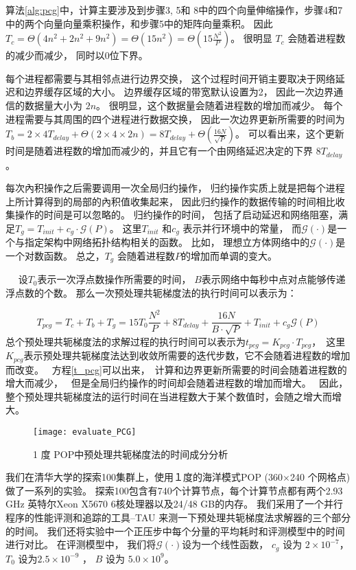 算法\ref{alg:pcg}中，计算主要涉及到步骤3, 5和 8中的四个向量伸缩操作，步骤4和7中的两个向量向量乘积操作，和步骤5中的矩阵向量乘积。 
 因此 $T_c= \Theta (4 n^2 +2n^2+ 9n^2) = \Theta (15n^2) =\Theta(15\frac{N^2}{P})$。 
很明显 $T_c$ 会随着进程数的减少而减少， 同时以0位下界。 


每个进程都需要与其相邻点进行边界交换， 这个过程时间开销主要取决于网络延迟和边界缓存区域的大小。 
边界缓存区域的带宽默认设置为2， 因此一次边界通信的数据量大小为 $2n$。 
很明显，这个数据量会随着进程数的增加而减少。 
每个进程需要与其周围的四个进程进行数据交换， 因此一次边界更新所需要的时间为$T_b =2\times4T_{delay} +\Theta (2\times4\times 2n)=8T_{delay} +\Theta (\frac{16N}{\sqrt{P}})$。 
可以看出来，这个更新时间是随着进程数的增加而减少的，并且它有一个由网络延迟决定的下界 $8T_{delay}$。 

 
每次內积操作之后需要调用一次全局归约操作， 归约操作实质上就是把每个进程上所计算得到的局部的內积值收集起来，
因此归约操作的数据传输的时间相比收集操作的时间是可以忽略的。 
归约操作的时间， 包括了启动延迟和网络阻塞，满足$T_g= T_{init}+ c_g\cdot \mathcal{G}(P)$。 
这里$T_{init}$ 和$c_g$ 表示并行环境中的常量， 而$\mathcal{G}(\cdot)$是一个与指定架构中网络拓扑结构相关的函数。 
比如， 理想立方体网络中的$\mathcal{G}(\cdot)$是一个对数函数。 
总之，$T_g$ 会随着进程数$P$的增加而单调的变大。 
 

　
设$T_0$表示一次浮点数操作所需要的时间， $B$表示网络中每秒中点对点能够传递浮点数的个数。 
那么一次预处理共轭梯度法的执行时间可以表示为：

\begin{equation}
\label{t_pcg}
T_{pcg} = T_c + T_b + T_g
= 15 T_0\frac{N^2}{P} + 8T_{delay} + \frac{16N}{B\cdot\sqrt{P}}+T_{init} +c_g\mathcal{G}(P)
\end{equation}
总个预处理共轭梯度法的求解过程的执行时间可以表示为$t_{pcg} = K_{pcg}\cdot T_{pcg}$，　这里$K_{pcg}$表示预处理共轭梯度法达到收敛所需要的迭代步数，它不会随着进程数的增加而改变。　
方程\ref{t_pcg}可以出来，　计算和边界更新所需要的时间会随着进程数的增大而减少，　
但是全局归约操作的时间却会随着进程数的增加而增大。　
因此，整个预处理共轭梯度法的运行时间在当进程数大于某个数值时，会随之增大而增大。　

\begin{figure}[ht]
\centering
\texttt{[image: evaluate\_PCG]}
\caption[] {1 度 POP中预处理共轭梯度法的时间成分分析\label{fig:pcg_ratio}}
\end{figure}

 
我们在清华大学的探索100集群上，使用１度的海洋模式POP (360$\times$240 个网格点)做了一系列的实验。 
探索100包含有740个计算节点，每个计算节点都有两个2.93 GHz 英特尔Xeon X5670 6核处理器以及24/48 GB的内存。 
我们采用了一个并行程序的性能评测和追踪的工具--TAU\cite{shende2006tau} 来测一下预处理共轭梯度法求解器的三个部分的时间。 
我们还将实验中一个正压步中每个分量的平均耗时和评测模型中的时间进行对比。 
在评测模型中， 我们将$\mathcal{G}(\cdot)$设为一个线性函数， $c_g$  设为 $2\times 10^{-7}$， $T_0$ 设为$2.5\times 10^{-9}$ ，  $B$  设为 $5.0\times 10^{9}$。 


